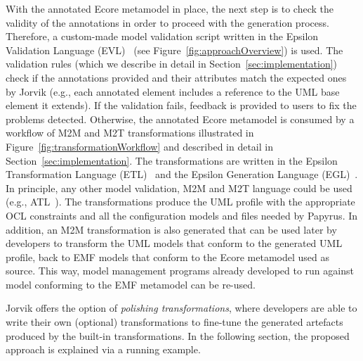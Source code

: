 With the annotated Ecore metamodel in place, the next step is to check the validity of the annotations in order to proceed with the generation process. 
Therefore, a custom-made model validation script written in the Epsilon Validation Language (EVL)~\cite{evlKolovos} (see Figure~\ref{fig:approachOverview}) is used.
The validation rules (which we describe in detail in Section~\ref{sec:implementation}) check if the annotations provided and their attributes match the expected ones by Jorvik (e.g., each annotated element includes a reference to the UML base element it extends). 
If the validation fails, feedback is provided to users to fix the problems detected. 
Otherwise, the annotated Ecore metamodel is consumed by a workflow of M2M and M2T  transformations illustrated in Figure~\ref{fig:transformationWorkflow} and described in detail in Section~\ref{sec:implementation}. 
The transformations are written in the Epsilon Transformation Language (ETL)~\cite{Kolovos2008} and the Epsilon Generation Language (EGL)~\cite{rose2008egl}. 
In principle, any other model validation, M2M and M2T language could be used (e.g., ATL~\cite{jouault2006atl}). 
The transformations produce the UML profile with the appropriate OCL constraints and all the configuration models and files needed by Papyrus. 
In addition, an M2M transformation is also generated that can be used later by developers to transform the UML models that conform to the generated UML profile, back to EMF models that conform to the Ecore metamodel used as source. 
This way, model management programs already developed to run against model conforming to the EMF metamodel can be re-used.

Jorvik offers the option of \textit{polishing transformations}, where developers are able to write their own (optional) transformations to fine-tune the generated artefacts produced by the built-in transformations. 
In the following section, the proposed approach is explained via a running example.


\begin{figure}[ht!]
	
	\vspace*{-5mm}
\end{figure}
